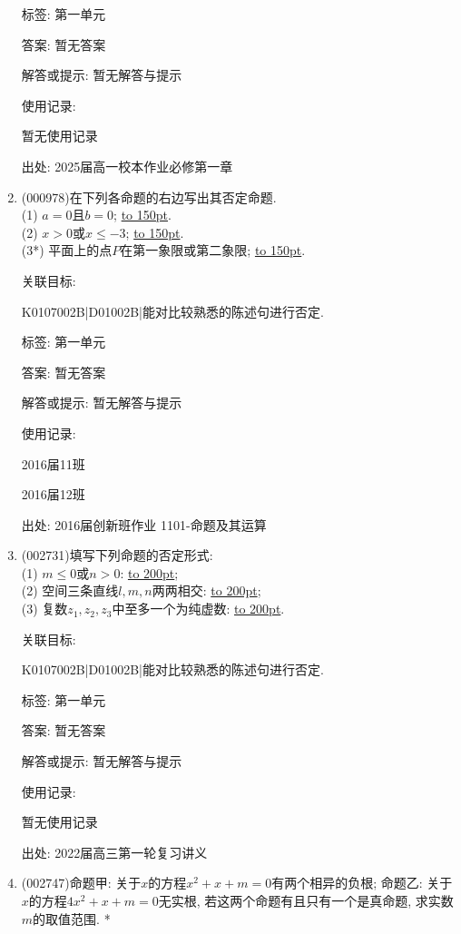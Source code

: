 \documentclass[10pt,a4paper]{article}
\newcommand{\blank}[1]{\underline{\hbox to #1pt{}}}
\begin{document}
\begin{enumerate}[1.]
标签: 第一单元

答案: 暂无答案

解答或提示: 暂无解答与提示

使用记录:

暂无使用记录


出处: 2025届高一校本作业必修第一章
\item { (000978)}在下列各命题的右边写出其否定命题.\\ 
(1) $a=0$且$b=0$; \blank{150}.\\ 
(2) $x>0$或$x \le -3$; \blank{150}.\\ 
(3*) 平面上的点$P$在第一象限或第二象限; \blank{150}.


关联目标:

K0107002B|D01002B|能对比较熟悉的陈述句进行否定.



标签: 第一单元

答案: 暂无答案

解答或提示: 暂无解答与提示

使用记录:

2016届11班			

2016届12班			


出处: 2016届创新班作业	1101-命题及其运算
\item { (002731)}填写下列命题的否定形式:\\
(1) $m\le 0$或$n>0$: \blank{200};\\
(2) 空间三条直线$l,m,n$两两相交: \blank{200};\\
(3) 复数$z_1,z_2,z_3$中至多一个为纯虚数: \blank{200}.


关联目标:

K0107002B|D01002B|能对比较熟悉的陈述句进行否定.



标签: 第一单元

答案: 暂无答案

解答或提示: 暂无解答与提示

使用记录:

暂无使用记录


出处: 2022届高三第一轮复习讲义
\item { (002747)}命题甲: 关于$x$的方程$x^2+x+m=0$有两个相异的负根; 命题乙: 关于$x$的方程$4x^2+x+m=0$无实根, 若这两个命题有且只有一个是真命题, 求实数$m$的取值范围.
*



\end{enumerate}
\end{document}
